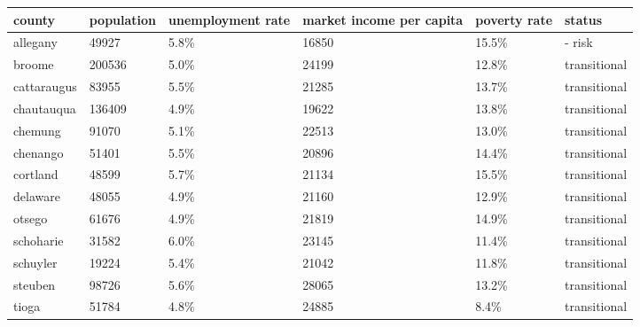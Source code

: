 \documentclass{article}
\begin{document}
\begin{tabular}{llllll}
\toprule
county & population & unemployment rate & market income per capita & poverty rate & status \\
\midrule
allegany & 49927 & 5.8\% & 16850 & 15.5\% & - risk \\
broome & 200536 & 5.0\% & 24199 & 12.8\% & transitional \\
cattaraugus & 83955 & 5.5\% & 21285 & 13.7\% & transitional \\
chautauqua & 136409 & 4.9\% & 19622 & 13.8\% & transitional \\
chemung & 91070 & 5.1\% & 22513 & 13.0\% & transitional \\
chenango & 51401 & 5.5\% & 20896 & 14.4\% & transitional \\
cortland & 48599 & 5.7\% & 21134 & 15.5\% & transitional \\
delaware & 48055 & 4.9\% & 21160 & 12.9\% & transitional \\
otsego & 61676 & 4.9\% & 21819 & 14.9\% & transitional \\
schoharie & 31582 & 6.0\% & 23145 & 11.4\% & transitional \\
schuyler & 19224 & 5.4\% & 21042 & 11.8\% & transitional \\
steuben & 98726 & 5.6\% & 28065 & 13.2\% & transitional \\
tioga & 51784 & 4.8\% & 24885 & 8.4\% & transitional \\
\bottomrule
\end{tabular}
\end{document}
